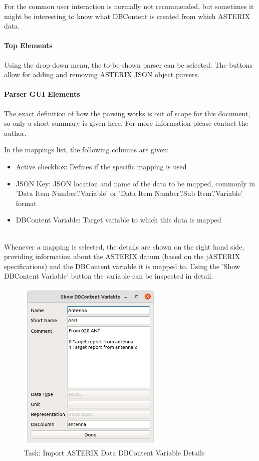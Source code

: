 For the common user interaction is normally not recommended, but sometimes it might be interesting to know what DBContent is created from which ASTERIX data.

\paragraph{Top Elements}

Using the drop-down menu, the to-be-shown parser can be selected. The buttons allow for adding and removing ASTERIX JSON object parsers.

\paragraph{Parser GUI Elements}

The exact definition of how the parsing works is out of scope for this document, so only a short summary is given here. For more information please contact the author.

In the mappings list, the following columns are given:

\begin{itemize}
\item Active checkbox: Defines if the specific mapping is used
\item JSON Key: JSON location and name of the data to be mapped, commonly in 'Data Item Number'.'Variable' or 'Data Item Number'.'Sub Item'.'Variable' format
\item DBContent Variable: Target variable to which this data is mapped
\end{itemize}
\ \\

Whenever a mapping is selected, the details are shown on the right hand side, providing information about the ASTERIX datum (based on the jASTERIX specifications) and the DBContent variable it is mapped to. 
Using the 'Show DBContent Variable' button the variable can be inspected in detail.

\begin{figure}[H]
  \center
    \includegraphics[width=7cm]{figures/asterix_import_data_dbcont_var_details.png}
  \caption{Task: Import ASTERIX Data DBContent Variable Details}
\end{figure}

